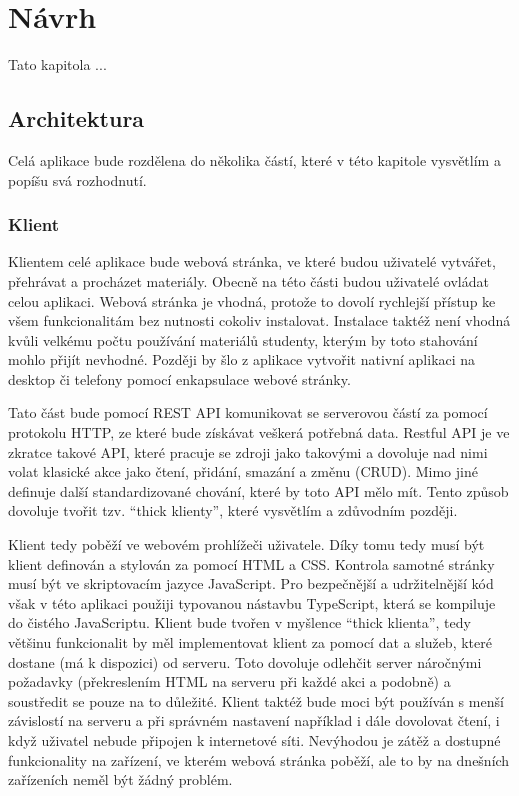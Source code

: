 \chapter{Návrh}

\begin{chapterabstract}
Tato kapitola ...
\end{chapterabstract}



\section{Architektura}

Celá aplikace bude rozdělena do několika částí, které v této kapitole vysvětlím a popíšu svá rozhodnutí.

\subsection{Klient}\label{text:navrh/klient}

Klientem celé aplikace bude webová stránka, ve které budou uživatelé vytvářet, přehrávat a procházet materiály. 
Obecně na této části budou uživatelé ovládat celou aplikaci.
Webová stránka je vhodná, protože to dovolí rychlejší přístup ke všem funkcionalitám bez nutnosti cokoliv instalovat.
Instalace taktéž není vhodná kvůli velkému počtu používání materiálů studenty, kterým by toto stahování mohlo přijít nevhodné.
Později by šlo z aplikace vytvořit nativní aplikaci na desktop či telefony pomocí enkapsulace webové stránky.

Tato část bude pomocí REST API komunikovat se serverovou částí za pomocí protokolu HTTP, ze které bude získávat veškerá potřebná data.
Restful API je ve zkratce takové API, které pracuje se zdroji jako takovými a dovoluje nad nimi volat klasické akce jako čtení, přidání, smazání a změnu (CRUD).
Mimo jiné definuje další standardizované chování, které by toto API mělo mít.
Tento způsob dovoluje tvořit tzv. \enquote{thick klienty}, které vysvětlím a zdůvodním později.

Klient tedy poběží ve webovém prohlížeči uživatele.
Díky tomu tedy musí být klient definován a stylován za pomocí HTML a CSS.
Kontrola samotné stránky musí být ve skriptovacím jazyce JavaScript.
Pro bezpečnější a udržitelnější kód však v této aplikaci použiji typovanou nástavbu TypeScript, která se kompiluje do čistého JavaScriptu.
Klient bude tvořen v myšlence \enquote{thick klienta}, tedy většinu funkcionalit by měl implementovat klient za pomocí dat a služeb, které dostane (má k dispozici) od serveru.
Toto dovoluje odlehčit server náročnými požadavky (překreslením HTML na serveru při každé akci a podobně) a soustředit se pouze na to důležité.
Klient taktéž bude moci být používán s menší závislostí na serveru a při správném nastavení například i dále dovolovat čtení, i když uživatel nebude připojen k internetové síti.
Nevýhodou je zátěž a dostupné funkcionality na zařízení, ve kterém webová stránka poběží, ale to by na dnešních zařízeních neměl být žádný problém.

